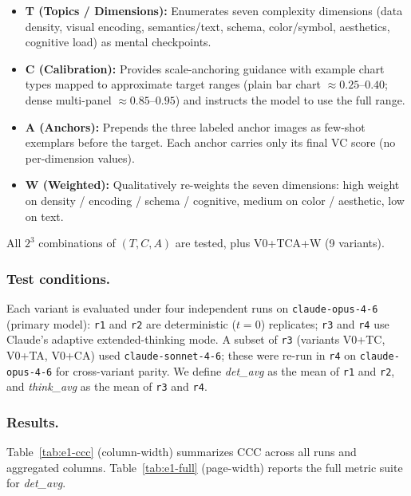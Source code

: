 \begin{itemize}
  \item \textbf{T (Topics / Dimensions):} Enumerates seven complexity
    dimensions (data density, visual encoding, semantics/text, schema,
    color/symbol, aesthetics, cognitive load) as mental checkpoints.
  \item \textbf{C (Calibration):} Provides scale-anchoring guidance with
    example chart types mapped to approximate target ranges
    (plain bar chart $\approx 0.25$--$0.40$; dense multi-panel
    $\approx 0.85$--$0.95$) and instructs the model to use the full range.
  \item \textbf{A (Anchors):} Prepends the three labeled anchor images as
    few-shot exemplars before the target. Each anchor carries only its final
    VC score (no per-dimension values).
  \item \textbf{W (Weighted):} Qualitatively re-weights the seven dimensions:
    high weight on density / encoding / schema / cognitive, medium on
    color / aesthetic, low on text.
\end{itemize}
All $2^3$ combinations of $(T, C, A)$ are tested, plus V0+TCA+W (9 variants).

\subsubsection{Test conditions.}
Each variant is evaluated under four independent runs on
\texttt{claude-opus-4-6} (primary model):
\texttt{r1} and \texttt{r2} are deterministic ($t=0$) replicates; \texttt{r3}
and \texttt{r4} use Claude's adaptive extended-thinking mode. A subset of
\texttt{r3} (variants V0+TC, V0+TA, V0+CA) used
\texttt{claude-sonnet-4-6}; these were re-run in \texttt{r4} on
\texttt{claude-opus-4-6} for cross-variant parity. We define
\emph{det\_avg} as the mean of \texttt{r1} and \texttt{r2}, and
\emph{think\_avg} as the mean of \texttt{r3} and \texttt{r4}.

\subsubsection{Results.}
Table~\ref{tab:e1-ccc} (column-width) summarizes CCC across all runs and
aggregated columns. Table~\ref{tab:e1-full} (page-width) reports the full
metric suite for \emph{det\_avg}.

